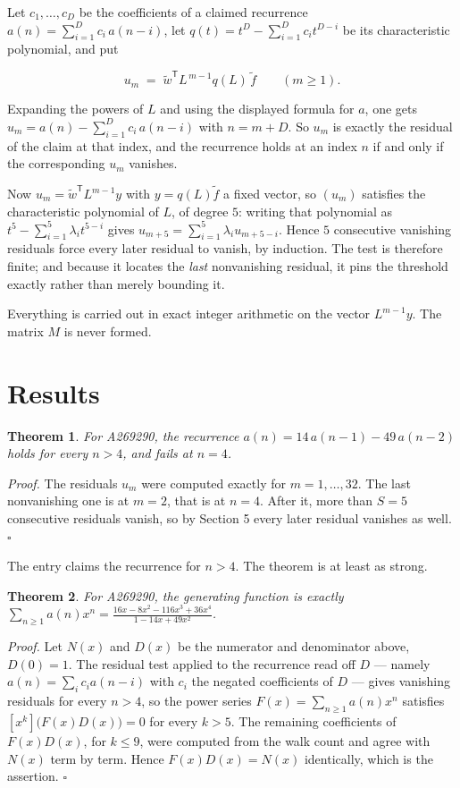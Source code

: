 \documentclass[11pt]{article}
\newtheorem{theorem}{Theorem}
\theoremstyle{definition}
\begin{document}
Let $c_1,\dots,c_D$ be the coefficients of a claimed recurrence $a(n) = \sum_{i=1}^{D} c_i\,a(n-i)$, let $q(t) = t^{D} - \sum_{i=1}^{D} c_i t^{D-i}$ be its characteristic polynomial, and put

\[u_m \;=\; \tilde w^{\mathsf T} L^{\,m-1} q(L)\,\tilde f \qquad (m \ge 1).\]

Expanding the powers of $L$ and using the displayed formula for $a$, one gets $u_m = a(n) - \sum_{i=1}^{D} c_i\,a(n-i)$ with $n = m + D$. So $u_m$ is exactly the residual of the claim at that index, and the recurrence holds at an index $n$ if and only if the corresponding $u_m$ vanishes.

Now $u_m = \tilde w^{\mathsf T} L^{m-1} y$ with $y = q(L)\tilde f$ a fixed vector, so $(u_m)$ satisfies the characteristic polynomial of $L$, of degree $5$: writing that polynomial as $t^{5} - \sum_{i=1}^{5} \lambda_i t^{5-i}$ gives $u_{m+5} = \sum_{i=1}^{5} \lambda_i u_{m+5-i}$. Hence $5$ consecutive vanishing residuals force every later residual to vanish, by induction. The test is therefore finite; and because it locates the {\itshape last} nonvanishing residual, it pins the threshold exactly rather than merely bounding it.

Everything is carried out in exact integer arithmetic on the vector $L^{m-1}y$. The matrix $M$ is never formed.

\section{Results}

\begin{theorem} For A269290, the recurrence $a(n) = 14\,a(n-1) - 49\,a(n-2)$ holds for every $n > 4$, and fails at $n = 4$.\end{theorem}

{\itshape Proof.} The residuals $u_m$ were computed exactly for $m = 1,\dots,32$. The last nonvanishing one is at $m = 2$, that is at $n = 4$. After it, more than $S = 5$ consecutive residuals vanish, so by Section 5 every later residual vanishes as well. $\square$

The entry claims the recurrence for $n > 4$. The theorem is at least as strong.

\begin{theorem} For A269290, the generating function is exactly $\sum_{n\ge 1} a(n)x^n = \frac{16x - 8x^{2} - 116x^{3} + 36x^{4}}{1 - 14x + 49x^{2}}$.\end{theorem}

{\itshape Proof.} Let $N(x)$ and $D(x)$ be the numerator and denominator above, $D(0)=1$. The residual test applied to the recurrence read off $D$ --- namely $a(n) = \sum_i c_i a(n-i)$ with $c_i$ the negated coefficients of $D$ --- gives vanishing residuals for every $n > 4$, so the power series $F(x)=\sum_{n\ge 1}a(n)x^n$ satisfies $[x^k]\bigl(F(x)D(x)\bigr) = 0$ for every $k > 5$. The remaining coefficients of $F(x)D(x)$, for $k \le 9$, were computed from the walk count and agree with $N(x)$ term by term. Hence $F(x)D(x) = N(x)$ identically, which is the assertion. $\square$
\end{document}
